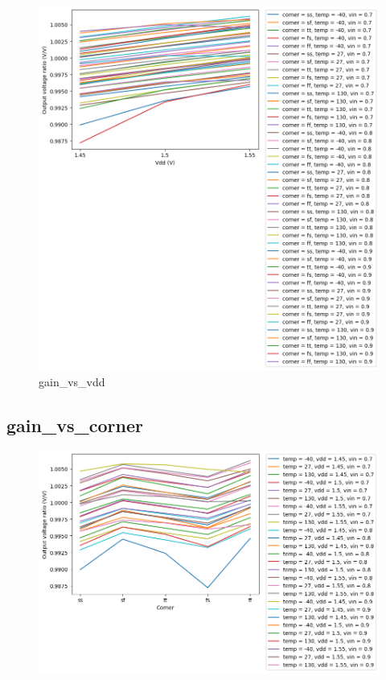 \documentclass[
  a4paper,
  DIV=11,
  numbers=noendperiod]{scrartcl}
\begin{document}
\begin{tcolorbox}
\begin{figure}[H]
{\centering \includegraphics{./cace/_docs/ota-5t/schematic/gain_vs_vdd.png}

}

\caption{gain\_vs\_vdd}

\end{figure}%

\subsection*{gain\_vs\_corner}\label{gain_vs_corner}

\begin{figure}[H]

{\centering \includegraphics{./cace/_docs/ota-5t/schematic/gain_vs_corner.png}

}
\end{figure}
\end{tcolorbox}
\end{document}
